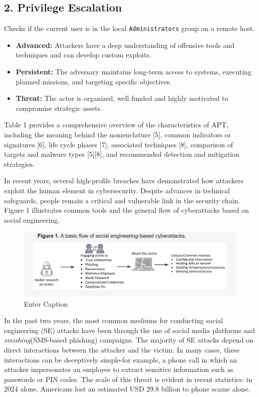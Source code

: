 {\subsection{2. Privilege Escalation}
Checks if the current user is in the local \texttt{Administrators} group on a remote host.
\begin{itemize}
    \item \textbf{Advanced:} Attackers have a deep understanding of offensive tools and techniques and can develop custom exploits.
    \item \textbf{Persistent:} The adversary maintains long-term access to systems, executing planned missions, and targeting specific objectives.
    \item \textbf{Threat:} The actor is organized, well funded and highly motivated to compromise strategic assets.
\end{itemize}
Table 1 provides a comprehensive overview of the characteristics of APT, including the meaning behind the nomenclature [5], common indicators or signatures [6], life cycle phases [7], associated techniques [8], comparison of targets and malware types [5][8], and recommended detection and mitigation strategies.

 
In recent years, several high-profile breaches have demonstrated how attackers exploit the human element in cybersecurity. Despite advances in technical safeguards, people remain a critical and vulnerable link in the security chain. Figure 1 illustrates common tools and the general flow of cyberattacks based on social engineering.

\begin{figure}
    \centering
    \includegraphics[width=1\linewidth]{soceng.png}
    \caption{Enter Caption}
    \label{fig:placeholder}
\end{figure}
In the past two years, the most common mediums for conducting social engineering (SE) attacks have been through the use of social media platforms and \textit{smishing}(SMS-based phishing) campaigns. The majority of SE attacks depend on direct interactions between the attacker and the victim. In many cases, these interactions can be deceptively simple-for example, a phone call in which an attacker impersonates an employee to extract sensitive information such as passwords or PIN codes. The scale of this threat is evident in recent statistics: in 2024 alone, Americans lost an estimated USD 29.8 billion to phone scame alone.

}
